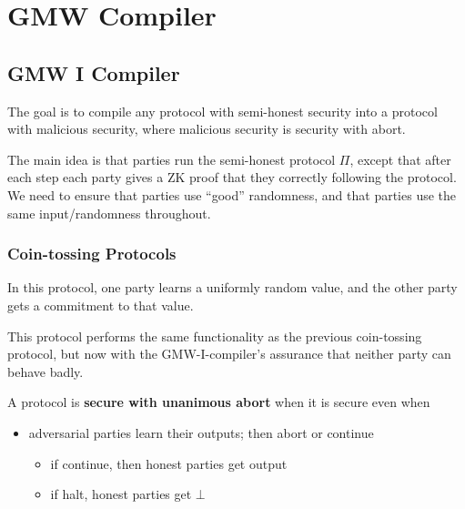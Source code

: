 \section{GMW Compiler}

\subsection{GMW I Compiler}

The goal is to compile any protocol with semi-honest security into a protocol with malicious security, where malicious security is security with abort.

The main idea is that parties run the semi-honest protocol $\Pi$, except that after each step each party gives a ZK proof that they correctly following the protocol. We need to ensure that parties use ``good'' randomness, and that parties use the same input/randomness throughout.


\subsubsection{Coin-tossing Protocols}

\begin{prcl}
In this protocol, one party learns a uniformly random value, and the other party gets a commitment to that value.
\end{prcl}

\begin{prcl}
This protocol performs the same functionality as the previous coin-tossing protocol, but now with the GMW-I-compiler's assurance that neither party can behave badly.
\end{prcl}

\begin{defn}
A protocol is \textbf{secure with unanimous abort} when it is secure even when 
\begin{itemize}
\item adversarial parties learn their outputs; then abort or continue
\begin{itemize}
    \item if continue, then honest parties get output
    \item if halt, honest parties get $\bot$
\end{itemize}
\end{itemize}
\end{defn}


